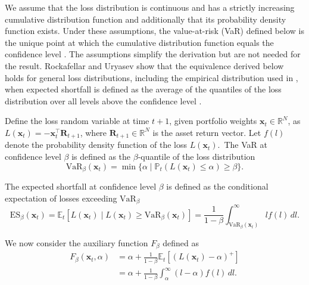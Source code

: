 We assume that the loss distribution is continuous and has a strictly increasing cumulative distribution function and additionally that its probability density
function exists. Under these assumptions, the value-at-risk (VaR) defined below is the unique point at which the
cumulative distribution function equals the confidence level \cite{QuantitativeRiskManagement2016}. The assumptions
simplify the derivation but are not needed for the result. Rockafellar and Uryasev \cite{RockafellarUryasev2002} show
that the equivalence derived below holds for general loss distributions, including the empirical distribution used in
, when expected shortfall is defined as the average of the quantiles of the loss
distribution over all levels above the confidence level \cite{acerbi2002coherenceexpectedshortfall}.

\newpage
Define the loss random variable at time $t+1$, given portfolio weights $\bm{x}_t\in\mathbb{R}^N$, as $L(\bm{x}_t) = -\bm{x}_t^\top \bm{R}_{t+1}$, where $\bm{R}_{t+1}\in\mathbb{R}^N$ is the asset return vector. Let $f(l)$ denote the probability density function of the loss $L(\bm{x}_t)$.\ The VaR at confidence level $\beta$ is defined as the $\beta$-quantile of the loss distribution
\begin{equation*}
    \text{VaR}_\beta(\bm{x}_t) = \min \{ \alpha \mid \mathbb{P}_t(L(\bm{x}_t) \le \alpha) \ge \beta \}.
\end{equation*}

The expected shortfall at confidence level $\beta$ is defined as the conditional expectation of losses exceeding $\text{VaR}_\beta$
\begin{equation*}
    \text{ES}_\beta(\bm{x}_t) = \mathbb{E}_t[L(\bm{x}_t) \mid L(\bm{x}_t) \ge \text{VaR}_\beta(\bm{x}_t)] = \frac{1}{1-\beta} \int_{\text{VaR}_\beta(\bm{x}_t)}^\infty l f(l) \, dl.
\end{equation*}

We now consider the auxiliary function $F_\beta$ defined as
\begin{align}
    F_\beta(\bm{x}_t, \alpha) &= \alpha + \frac{1}{1-\beta} \mathbb{E}_t[(L(\bm{x}_t) - \alpha)^+] \nonumber \\ 
    &= \alpha + \frac{1}{1-\beta} \int_\alpha^\infty (l - \alpha) f(l) \, dl. \label{eq:aux-function-es}
\end{align}
 
